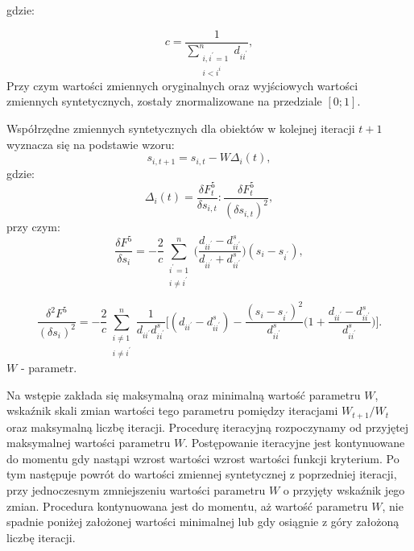 \documentclass[12pt,a4paper]{report}
\begin{document}
gdzie:

\begin{equation}
c=\frac{1}{\sum_{\substack{i,i^{'}=1 \\ i<i^{i}}}^n d_{ii^{'}}},
\end{equation}
Przy czym wartości zmiennych oryginalnych oraz wyjściowych wartości zmiennych syntetycznych, zostały znormalizowane na przedziale $[0;1]$.

Współrzędne zmiennych syntetycznych dla obiektów w kolejnej iteracji $t+1$ wyznacza się na podstawie wzoru:
\begin{equation}
s_{i,t+1}=s_{i,t} - W\Delta_{i}(t),
\end{equation}
gdzie:
\begin{equation}
\Delta_{i}(t)=\frac{\delta F_{t}^{5}}{\delta s_{i,t}} : \frac{\delta F_{t}^{5}}{(\delta s_{i,t})^{2}},
\end{equation}
przy czym:
\begin{equation}
\frac{\delta F^{5}}{\delta s_{i}}=-\frac{2}{c}\sum_{\substack{i^{'}=1 \\ i \neq i^{'}}}^n \bigg( \frac{d_{ii^{'}} - d_{ii^{'}}^s}{d_{ii^{'}}+d_{ii^{'}}^{s}} \bigg)(s_{i} - s_{i^{'}}),
\end{equation}

\begin{equation}
\frac{\delta^2 F^{5}}{(\delta s_{i})^{2}}=-\frac{2}{c}\sum_{\substack{i\neq1 \\ i \neq i^{'}}}^n \frac{1}{d_{ii^{'}}d_{ii^{'}}^{s}} \bigg[ (d_{ii^{'}} - d_{ii^{'}}^s) - \frac{(s_i - s_{i^{'}})^2}{d_{ii^{'}}^s} \bigg( 1+ \frac{d_{ii^{'}}-d_{ii^{'}}^{s}}{d_{ii^{'}}^s} \bigg) \bigg].
\end{equation}
\newline
$W$ - parametr.

Na wstępie zakłada się maksymalną oraz minimalną wartość parametru $W$, wskaźnik skali zmian wartości tego parametru pomiędzy iteracjami $W_{t+1}/W_{t}$ oraz maksymalną liczbę iteracji. Procedurę iteracyjną rozpoczynamy od przyjętej maksymalnej wartości parametru $W$. Postępowanie iteracyjne jest kontynuowane do momentu gdy nastąpi wzrost wartości wzrost wartości funkcji kryterium. Po tym następuje powrót do wartości zmiennej syntetycznej z poprzedniej iteracji, przy jednoczesnym zmniejszeniu wartości parametru $W$ o przyjęty wskaźnik jego zmian. Procedura kontynuowana jest do momentu, aż wartość parametru $W$, nie spadnie poniżej założonej wartości minimalnej lub gdy osiągnie z góry założoną liczbę iteracji. 
\end{document}
